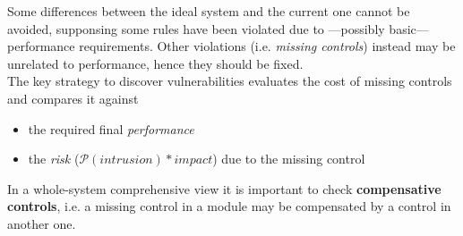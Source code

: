 Some differences between the ideal system and the current one cannot be avoided, supponsing some rules have been violated due to {---}possibly basic{---} performance requirements.
Other violations (i.e. \textit{missing controls}) instead may be unrelated to
performance, hence they should be fixed.\\
The key strategy to discover vulnerabilities evaluates the cost of
missing controls and compares it against
\begin{itemize}
   \item the required final \textit{performance}
   \item the \textit{risk} ($\mathcal{P}(intrusion) *impact$) due to the missing control
\end{itemize}
In a whole-system comprehensive view it is important to check \textbf{compensative controls}, i.e.
a missing control in a module may be compensated by a
control in another one.

